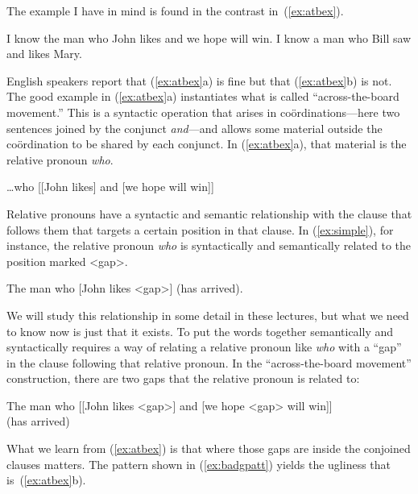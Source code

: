 {The example I have in mind is found in the contrast in~(\ref{ex:atbex}).
\begin{exe}
	\raggedright
	\ex \label{ex:atbex} 
	\begin{xlist}
		\ex I know the man who John likes and we hope will win.
		\ex I know a man who Bill saw and likes Mary.
	\end{xlist}
	\hspace*{\fill} \citep[34]{Williams:1978} \hspace*{.5in}
\end{exe}
English speakers report that (\ref{ex:atbex}a) is fine but that (\ref{ex:atbex}b) is not. The good example in (\ref{ex:atbex}a) instantiates what is called ``across-the-board movement.'' This is a syntactic operation that arises in co\"ordinations---here two sentences joined by the conjunct \emph{and}---and allows some material outside the co\"ordination to be shared by each conjunct. In (\ref{ex:atbex}a), that material is the relative pronoun \emph{who}.
\begin{exe}
	\raggedright
	\ex \label{ex:illshare} \ldots who [[John likes] and [we hope will win]]
\end{exe}
Relative pronouns have a syntactic and semantic relationship with the clause that follows them that targets a certain position in that clause. In (\ref{ex:simple}), for instance, the relative pronoun \emph{who} is syntactically and semantically related to the position marked <gap>.
\begin{exe}
	\raggedright
	\ex \label{ex:simple} 
	The man who [John likes <gap>] (has arrived).
\end{exe}
We will study this relationship in some detail in these lectures, but what we need to know now is just that it exists. To put the words together semantically and syntactically requires a way of relating a relative pronoun like \emph{who} with a ``gap'' in the clause following that relative pronoun. In the ``across-the-board movement'' construction, there are two gaps that the relative pronoun is related to:
\begin{exe}
	\raggedright
	\ex \label{ex:simple2} 
	The man who [[John likes <gap>] and [we hope <gap> will win]]\\ (has arrived)
\end{exe}
What we learn from (\ref{ex:atbex}) is that where those gaps are inside the conjoined clauses matters. The pattern shown in (\ref{ex:badgpatt}) yields the ugliness that is~(\ref{ex:atbex}b).
\begin{exe}
	\raggedright

\end{exe}}
